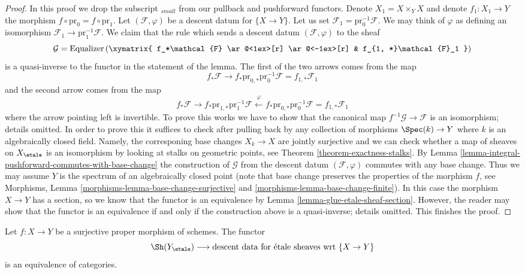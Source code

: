 \begin{proof}
In this proof we drop the subscript ${}_{small}$ from our pullback
and pushforward functors.
Denote $X_1 = X \times_Y X$ and denote $f_1 : X_1 \to Y$ the
morphism $f \circ \text{pr}_0 = f \circ \text{pr}_1$.
Let $(\mathcal{F}, \varphi)$ be a descent datum for $\{X \to Y\}$.
Let us set $\mathcal{F}_1 = \text{pr}_0^{-1}\mathcal{F}$.
We may think of $\varphi$ as defining an isomorphism
$\mathcal{F}_1 \to \text{pr}_1^{-1}\mathcal{F}$.
We claim that the rule which sends a descent datum
$(\mathcal{F}, \varphi)$
to the sheaf
$$
\mathcal{G} =
\text{Equalizer}\left(
\xymatrix{
f_*\mathcal{F}
\ar@<1ex>[r] \ar@<-1ex>[r] &
f_{1, *}\mathcal{F}_1
}
\right)
$$
is a quasi-inverse to the functor in the statement of the lemma.
The first of the two arrows comes from the map
$$
f_*\mathcal{F} \to
f_*\text{pr}_{0, *}\text{pr}_0^{-1}\mathcal{F} =
f_{1, *}\mathcal{F}_1
$$
and the second arrow comes from the map
$$
f_*\mathcal{F} \to
f_* \text{pr}_{1, *}\text{pr}_1^{-1}\mathcal{F}
\xleftarrow{\varphi}
f_* \text{pr}_{0, *} \text{pr}_0^{-1}\mathcal{F} =
f_{1, *}\mathcal{F}_1
$$
where the arrow pointing left is invertible.
To prove this works we have to show
that the canonical map $f^{-1}\mathcal{G} \to \mathcal{F}$
is an isomorphism; details omitted. In order to prove this it
suffices to check after pulling back by any collection of morphisms
$\Spec(k) \to Y$ where $k$ is an algebraically closed field.
Namely, the corresponing base changes $X_k \to X$ are jointly
surjective and we can check whether a map of sheaves on $X_\etale$
is an isomorphism by looking at stalks on geometric points, see
Theorem \ref{theorem-exactness-stalks}.
By Lemma \ref{lemma-integral-pushforward-commutes-with-base-change}
the construction of $\mathcal{G}$ from the descent datum
$(\mathcal{F}, \varphi)$ commutes with any base change.
Thus we may assume $Y$ is the spectrum of an algebraically
closed point (note that base change preserves the properties
of the morphism $f$, see
Morphisms, Lemma \ref{morphisms-lemma-base-change-surjective}
and \ref{morphisms-lemma-base-change-finite}).
In this case the morphism $X \to Y$ has a section, so we
know that the functor is an equivalence by
Lemma \ref{lemma-glue-etale-sheaf-section}.
However, the reader may show that the functor is an equivalence
if and only if the construction above is a quasi-inverse;
details omitted. This finishes the proof.
\end{proof}

\begin{lemma}
\label{lemma-glue-etale-sheaf-proper-surjective}
Let $f : X \to Y$ be a surjective proper morphism of schemes.
The functor
$$
\Sh(Y_\etale)
\longrightarrow
\text{descent data for \'etale sheaves wrt }\{X \to Y\}
$$
is an equivalence of categories.
\end{lemma}


